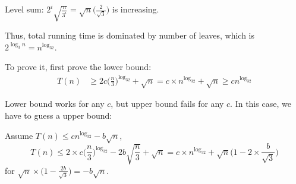 Level sum: $\displaystyle 2^i\sqrt{\frac{n}{3^i}} = \sqrt{n}\bigg(\frac{2}{\sqrt{3}}\bigg)$ is increasing.

Thus, total running time is dominated by number of leaves, which is
$2^{\log_3n}=n^{\log_32}$.

To prove it, first prove the lower bound:
\begin{align*}
    T(n) &\geq 2c\bigg(\frac{n}{3}\bigg)^{\log_32} + \sqrt{n}
         = c \times n^{\log_32} + \sqrt{n}
         \geq cn^{\log_32}
\end{align*}

Lower bound works for any $c$, but upper bound fails for any $c$.
In this case, we have to guess a upper bound:

Assume $T(n) \leq cn^{\log_32} - b\sqrt{n}$,
\[T(n) \leq 2 \times c \bigg(\frac{n}{3}\bigg)^{\log_32} - 2b\sqrt{\frac{n}{3}} + \sqrt{n}
= c \times n^{\log_32} + \sqrt{n}\bigg(1 - 2 \times \frac{b}{\sqrt{3}}\bigg)\]
for $\displaystyle \sqrt{n}\times\bigg(1 - \frac{2b}{\sqrt{3}}\bigg) = -b\sqrt{n}$.

